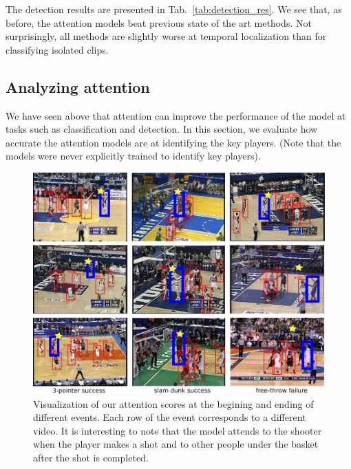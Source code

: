  The detection results
are presented in Tab.~\ref{tab:detection_res}.
We see that, as before, the attention models beat previous state of
the art methods.
Not surprisingly, all methods are slightly worse at temporal
localization
than for classifying
isolated clips.

\subsection{Analyzing attention}

We have seen above that attention can improve the performance of the
model at tasks such as classification and detection. 
In this section, we evaluate how accurate the attention models are at
identifying the key players. (Note that the models were never
explicitly trained to identify key players).



\begin{figure}[t!]
\begin{center}
   \includegraphics[width=1.0\linewidth]{images/visual_examples_v2.pdf}
\end{center}
   \caption{Visualization of our attention scores at the begining and ending of different events.
Each row of the event corresponds to a different video. It is interesting to note that the model
attends to the shooter when the player makes a shot and to other people under the basket after
the shot is completed.}
\label{fig:visual_attention}
\end{figure}



